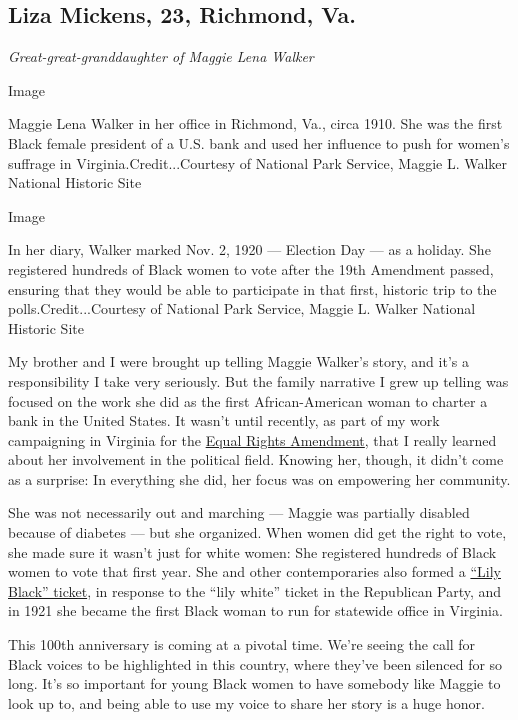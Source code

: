 \hypertarget{liza-mickens-23-richmond-va}{%
\subsection{Liza Mickens, 23, Richmond,
Va.}\label{liza-mickens-23-richmond-va}}

\emph{Great-great-granddaughter of Maggie Lena Walker}

Image

Maggie Lena Walker in her office in Richmond, Va., circa 1910. She was
the first Black female president of a U.S. bank and used her influence
to push for women's suffrage in Virginia.Credit...Courtesy of National
Park Service, Maggie L. Walker National Historic Site

Image

In her diary, Walker marked Nov. 2, 1920 --- Election Day --- as a
holiday. She registered hundreds of Black women to vote after the 19th
Amendment passed, ensuring that they would be able to participate in
that first, historic trip to the polls.Credit...Courtesy of National
Park Service, Maggie L. Walker National Historic Site

My brother and I were brought up telling Maggie Walker's story, and it's
a responsibility I take very seriously. But the family narrative I grew
up telling was focused on the work she did as the first African-American
woman to charter a bank in the United States. It wasn't until recently,
as part of my work campaigning in Virginia for the
\href{https://www.nytimes.com/2020/01/15/us/era-virginia-vote.html}{Equal
Rights Amendment}, that I really learned about her involvement in the
political field. Knowing her, though, it didn't come as a surprise: In
everything she did, her focus was on empowering her community.

She was not necessarily out and marching --- Maggie was partially
disabled because of diabetes --- but she organized. When women did get
the right to vote, she made sure it wasn't just for white women: She
registered hundreds of Black women to vote that first year. She and
other contemporaries also formed a
\href{https://digitalsc.lib.vt.edu/exhibits/show/womens-history-2016/item/4697}{``Lily
Black'' ticket}, in response to the ``lily white'' ticket in the
Republican Party, and in 1921 she became the first Black woman to run
for statewide office in Virginia.

This 100th anniversary is coming at a pivotal time. We're seeing the
call for Black voices to be highlighted in this country, where they've
been silenced for so long. It's so important for young Black women to
have somebody like Maggie to look up to, and being able to use my voice
to share her story is a huge honor.

